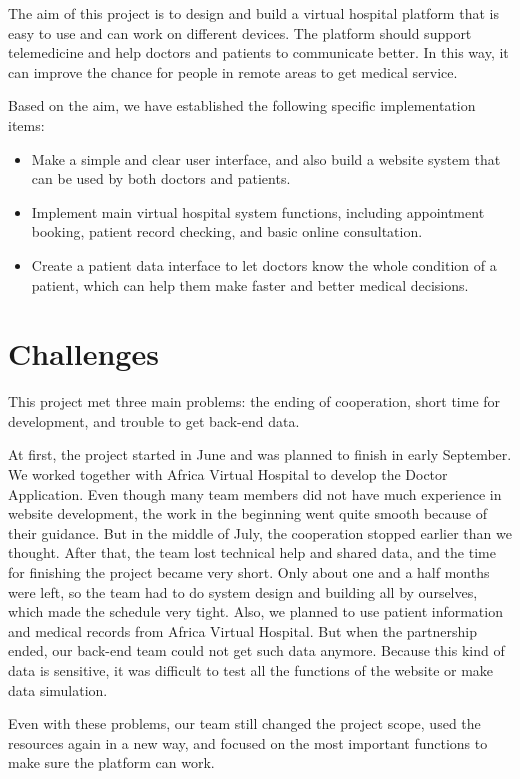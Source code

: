The aim of this project is to design and build a virtual hospital platform that is easy to use and can work on different devices. The platform should support telemedicine and help doctors and patients to communicate better. In this way, it can improve the chance for people in remote areas to get medical service.

Based on the aim, we have established the following specific implementation items:

\begin {itemize}
    \item {Make a simple and clear user interface, and also build a website system that can be used by both doctors and patients.}
    \item {Implement main virtual hospital system functions, including appointment booking, patient record checking, and basic online consultation.}
    \item {Create a patient data interface to let doctors know the whole condition of a patient, which can help them make faster and better medical decisions.}
\end {itemize}


\section{Challenges}
\label{sec:sec04}

This project met three main problems: the ending of cooperation, short time for development, and trouble to get back-end data.

At first, the project started in June and was planned to finish in early September. We worked together with Africa Virtual Hospital to develop the Doctor Application. Even though many team members did not have much experience in website development, the work in the beginning went quite smooth because of their guidance. But in the middle of July, the cooperation stopped earlier than we thought. After that, the team lost technical help and shared data, and the time for finishing the project became very short. Only about one and a half months were left, so the team had to do system design and building all by ourselves, which made the schedule very tight. Also, we planned to use patient information and medical records from Africa Virtual Hospital. But when the partnership ended, our back-end team could not get such data anymore. Because this kind of data is sensitive, it was difficult to test all the functions of the website or make data simulation.

Even with these problems, our team still changed the project scope, used the resources again in a new way, and focused on the most important functions to make sure the platform can work.

